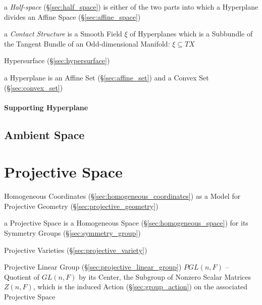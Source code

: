a \emph{Half-space} (\S\ref{sec:half_space}) is either of the two parts into
which a Hyperplane divides an Affine Space (\S\ref{sec:affine_space})

a \emph{Contact Structure} is a Smooth Field $\xi$ of Hyperplanes which is a
Subbundle of the Tangent Bundle of an Odd-dimensional Manifold: $\xi \subseteq
T X$

\fist Hypersurface (\S\ref{sec:hypersurface})

a Hyperplane is an Affine Set (\S\ref{sec:affine_set}) and a Convex Set
(\S\ref{sec:convex_set})



\paragraph{Supporting Hyperplane}\label{sec:supporting_hyperplane}\hfill



\subsection{Ambient Space}\label{sec:ambient_space}




\section{Projective Space}\label{sec:projective_space}

Homogeneous Coordinates (\S\ref{sec:homogeneous_coordinates}) as a Model for
Projective Geometry (\S\ref{sec:projective_geometry})

a Projective Space is a Homogeneous Space (\S\ref{sec:homogeneous_space}) for
its Symmetry Groups (\S\ref{sec:symmetry_group}) %

\fist Projective Varieties (\S\ref{sec:projective_variety})

Projective Linear Group (\S\ref{sec:projective_linear_group}) $PGL(n,F)$ --
Quotient of $GL(n,F)$ by its Center, the Subgroup of Nonzero Scalar Matrices
$Z(n,F)$, which is the induced Action (\S\ref{sec:group_action}) on the
associated Projective Space

